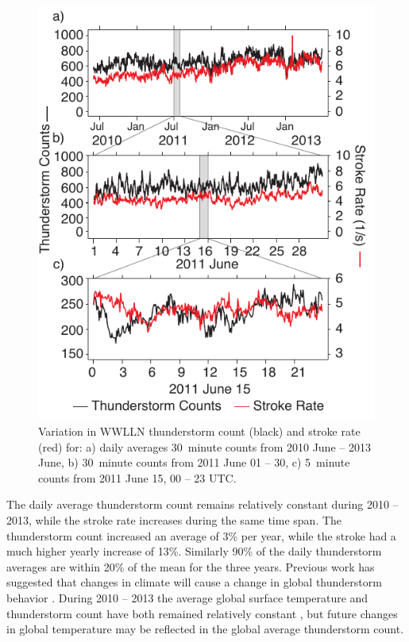  \begin{figure}[ht!]
    \centering
    \includegraphics[scale=1]{GEC/Figures/timescale.pdf}
    \caption{Variation in WWLLN thunderstorm count (black) and stroke rate (red) for:
    		a) daily averages 30~minute counts from 2010 June -- 2013 June,
		b) 30~minute counts from 2011 June 01 -- 30,
		c) 5~minute counts from 2011 June 15, 00 -- 23 UTC.}
    \label{gec:fig:timescale}
 \end{figure}

The daily average thunderstorm count remains relatively constant during 2010 -- 2013, while the stroke rate increases during the same time span.
The thunderstorm count increased an average of 3\% per year, while the stroke had a much higher yearly increase of 13\%.
Similarly 90\% of the daily thunderstorm averages are within 20\% of the mean for the three years.
Previous work has suggested that changes in climate will cause a change in global thunderstorm behavior \citep{Williams2005a, Price2009a}.
During 2010 -- 2013 the average global surface temperature and thunderstorm count have both remained relatively constant \citep{Hansen2013a}, but future changes in global temperature may be reflected in the global average thunderstorm count.

